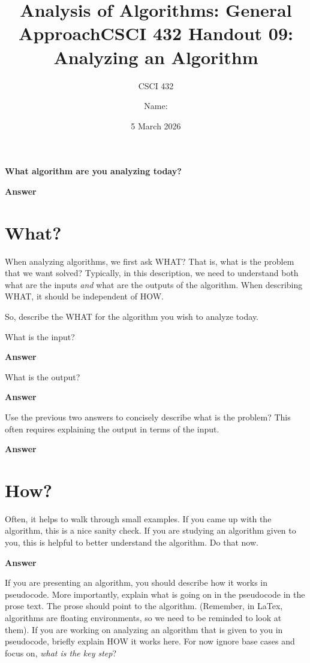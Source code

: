 \documentclass{article}
\title{Analysis of Algorithms: General Approach}
\author{CSCI 432}
\title{CSCI 432 Handout 09: Analyzing an Algorithm}
\author{Name: \rule{3in}{0.15mm}}
\date{5 March 2026}
\begin{document}
\maketitle

\noindent
{\bf What algorithm are you analyzing today?}

\textbf{Answer}
\vspace{1in}

\section{What?}

When analyzing algorithms, we first ask WHAT?  That is, what is the problem that
we want solved?  Typically, in this description, we need to understand both what
are the inputs \emph{and} what are the outputs of the algorithm.  When
describing WHAT, it should be independent of HOW.

So, describe the WHAT for the algorithm you wish to analyze today.

What is the input?

\textbf{Answer}
\vspace{0.75in}

What is the output?

\textbf{Answer}
\vspace{0.75in}

Use the previous two answers to concisely describe what is the problem?  This
often requires explaining the output in terms of the input.

\textbf{Answer}
\vspace{1in}

\section{How?}

Often, it helps to walk through small examples.  If you came up with the
algorithm, this is a nice sanity check.  If you are studying an algorithm given
to you, this is helpful to better understand the algorithm.  Do that now.

\textbf{Answer}
\vspace{3in}

If you are presenting an algorithm, you should describe how it works in
pseudocode.  More importantly, explain what is going on in the pseudocode in the
prose text.  The prose should point to the algorithm.  (Remember, in LaTex,
algorithms are floating environments, so we need to be reminded to look at
them). If you are working on analyzing an algorithm that is given to you in
pseudocode, briefly explain HOW it works here.  For now ignore base cases and
focus on, \emph{what is the key step}?
\end{document}
